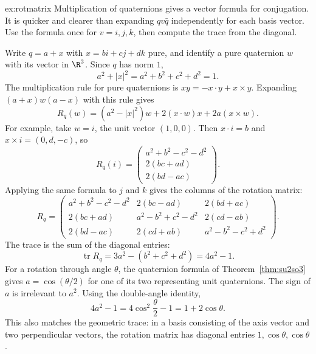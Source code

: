 \begin{solution}{ex:rotmatrix}
\idea Multiplication of quaternions gives a vector formula for conjugation. It is quicker and clearer than expanding $qv\bar q$ independently for each basis vector. Use the formula once for $v=i,j,k$, then compute the trace from the diagonal.

\writeup Write $q=a+x$ with $x=bi+cj+dk$ pure, and identify a pure quaternion $w$ with its vector in $\R^3$. Since $q$ has norm $1$,
\[
a^2+|x|^2=a^2+b^2+c^2+d^2=1.
\]
The multiplication rule for pure quaternions is $xy=-x\cdot y+x\times y$. Expanding $(a+x)w(a-x)$ with this rule gives
\[
R_q(w)=(a^2-|x|^2)w+2(x\cdot w)x+2a(x\times w).
\]
For example, take $w=i$, the unit vector $(1,0,0)$. Then $x\cdot i=b$ and $x\times i=(0,d,-c)$, so
\[
R_q(i)=\begin{pmatrix}
a^2+b^2-c^2-d^2\\2(bc+ad)\\2(bd-ac)
\end{pmatrix}.
\]
Applying the same formula to $j$ and $k$ gives the columns of the rotation matrix:
\[
R_q=
\begin{pmatrix}
a^2+b^2-c^2-d^2 & 2(bc-ad) & 2(bd+ac)\\
2(bc+ad) & a^2-b^2+c^2-d^2 & 2(cd-ab)\\
2(bd-ac) & 2(cd+ab) & a^2-b^2-c^2+d^2
\end{pmatrix}.
\]
The trace is the sum of the diagonal entries:
\[
\operatorname{tr}R_q
=3a^2-(b^2+c^2+d^2)=4a^2-1.
\]
For a rotation through angle $\theta$, the quaternion formula of Theorem~\ref{thm:su2so3} gives $a=\cos(\theta/2)$ for one of its two representing unit quaternions. The sign of $a$ is irrelevant to $a^2$. Using the double-angle identity,
\[
4a^2-1=4\cos^2\frac\theta2-1=1+2\cos\theta.
\]
This also matches the geometric trace: in a basis consisting of the axis vector and two perpendicular vectors, the rotation matrix has diagonal entries $1,\cos\theta,\cos\theta$.
\end{solution}

